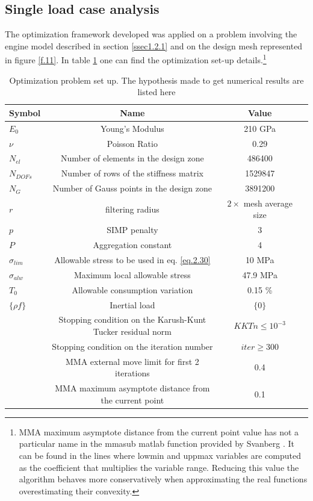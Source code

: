  \subsection{Single load case analysis}
   The optimization framework developed was applied on a problem involving the engine model described in section \ref{ssec1.2.1} and on the design mesh represented in figure \ref{f.11}.  In table \ref{tab:table2} one can find the optimization set-up details.\footnote{MMA maximum asymptote distance from the current point value has not a particular name in the mmasub matlab function provided by Svanberg \cite{svanberg2004some}. It can be found in the lines where lowmin and uppmax variables are computed as the coefficient that multiplies the variable range. Reducing this value the algorithm behaves more conservatively when approximating the real functions overestimating their convexity.}
    \begin{table}[h]
         \caption{\label{tab:table2} Optimization problem set up. The hypothesis made to get numerical results are listed here}
          \centering
          \begin{tabular}{lccc}
          \hline
           Symbol& Name& Value\\\hline
          $E_0$ & Young's Modulus & 210 GPa\\
          $\nu$ & Poisson Ratio& 0.29&\\ $N_{el}$ & Number of elements in the design zone & 486400 \\
          $N_{DOFs}$ & Number of rows of the stiffness matrix & 1529847\\
          $N_G$ & Number of Gauss points in the design zone & 3891200\\
 		$r$ & filtering radius & $2 \times$ mesh average size  \\
 		$p$ & SIMP penalty & 3\\
 		$P$ & Aggregation constant & 4\\  
 		$\sigma_{lim}$ & Allowable stress to be used in eq. \ref{eq.2.30} & 10 MPa\\
 		$\sigma_{alw}$ & Maximum local allowable stress & 47.9 MPa\\
 		$T_0$ & Allowable consumption variation & 0.15 \% \\
 		$\lbrace\rho f \rbrace$ & Inertial load & $\lbrace 0 \rbrace$ \\
 		 & Stopping condition on the Karush-Kunt Tucker residual norm & $KKTn\leq10^{-3}$\\ 
 		& Stopping condition on the iteration number & $iter \geq 300$ \\
 		& MMA external move limit for first 2 iterations & 0.4 \\
 		& MMA maximum asymptote distance from the current point & 0.1 \\
          \hline
          \end{tabular}
          \end{table}
